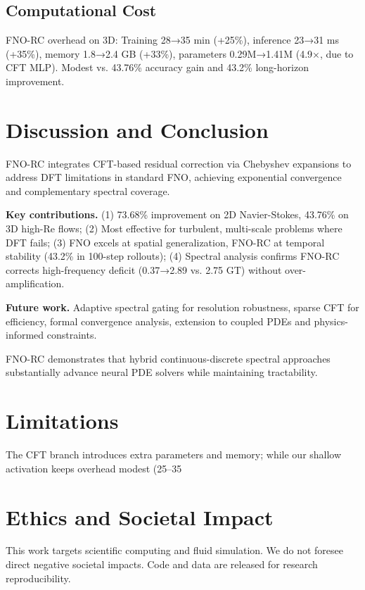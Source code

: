 \documentclass[11pt]{article}
\begin{document}
\subsection{Computational Cost}

FNO-RC overhead on 3D: Training 28→35 min (+25\%), inference 23→31 ms (+35\%), memory 1.8→2.4 GB (+33\%), parameters 0.29M→1.41M (4.9×, due to CFT MLP). Modest vs. 43.76\% accuracy gain and 43.2\% long-horizon improvement.

\section{Discussion and Conclusion}

FNO-RC integrates CFT-based residual correction via Chebyshev expansions to address DFT limitations in standard FNO, achieving exponential convergence and complementary spectral coverage.

\textbf{Key contributions.} (1) 73.68\% improvement on 2D Navier-Stokes, 43.76\% on 3D high-Re flows; (2) Most effective for turbulent, multi-scale problems where DFT fails; (3) FNO excels at spatial generalization, FNO-RC at temporal stability (43.2\% in 100-step rollouts); (4) Spectral analysis confirms FNO-RC corrects high-frequency deficit (0.37→2.89 vs. 2.75 GT) without over-amplification.

\textbf{Future work.} Adaptive spectral gating for resolution robustness, sparse CFT for efficiency, formal convergence analysis, extension to coupled PDEs and physics-informed constraints.

FNO-RC demonstrates that hybrid continuous-discrete spectral approaches substantially advance neural PDE solvers while maintaining tractability.

\section*{Limitations}
The CFT branch introduces extra parameters and memory; while our shallow activation keeps overhead modest (25–35%

\section*{Ethics and Societal Impact}
This work targets scientific computing and fluid simulation. We do not foresee direct negative societal impacts. Code and data are released for research reproducibility.
\end{document}
